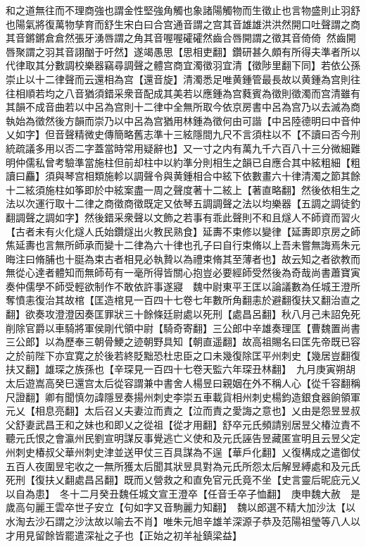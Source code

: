 和之道無往而不理商強也謂金性堅強角觸也象諸陽觸物而生徵止也言物盛則止羽舒也陽氣將復萬物孳育而舒生宋白曰合宫通音謂之宫其音雄雄洪洪然開口吐聲謂之商其音鏘鏘倉倉然張牙湧唇謂之角其音喔喔礭礭然齒合唇開謂之徵其音倚倚然齒開唇聚謂之羽其音詡酗于吁然】遂竭愚思【思相吏翻】鑽研甚久頗有所得夫準者所以代律取其分數調校樂器竊尋調聲之體宫商宜濁徵羽宜清【徵陟里翻下同】若依公孫崇止以十二律聲而云還相為宫【還音旋】清濁悉足唯黄鍾管最長故以黄鍾為宫則往往相順若均之八音猶須錯采衆音配成其美若以應鍾為宫蕤賓為徵則徵濁而宫清雖有其韻不成音曲若以中呂為宫則十二律中全無所取今依京房書中呂為宫乃以去滅為商執始為徵然後方韻而崇乃以中呂為宫猶用林鍾為徵何由可諧【中呂陸德明曰中音仲乂如字】但音聲精微史傳簡略舊志準十三絃隱間九尺不言須柱以不【不讀曰否今刑統疏議多用以否二字蓋當時常用疑辭也】又一寸之内有萬九千六百八十三分微細難明仲儒私曾考驗準當施柱但前却柱中以約準分則相生之韻已自應合其中絃粗細【粗讀曰麤】須與琴宫相類施軫以調聲令與黄鍾相合中絃下依數畫六十律清濁之節其餘十二絃須施柱如筝即於中絃案盡一周之聲度著十二絃上【著直略翻】然後依相生之法以次運行取十二律之商徵商徵既定又依琴五調調聲之法以均樂器【五調之調徒釣翻調聲之調如字】然後錯采衆聲以文飾之若事有乖此聲則不和且燧人不師資而習火【古者未有火化燧人氏始鑽燧出火教民熟食】延夀不束修以變律【延夀即京房之師焦延夀也言無所師承而變十二律為六十律也孔子曰自行束脩以上吾未嘗無誨焉朱元晦注曰脩脯也十脡為束古者相見必執贄以為禮束脩其至薄者也】故云知之者欲教而無從心達者體知而無師苟有一毫所得皆關心抱豈必要經師受然後為奇哉尚書蕭寶寅奏仲儒學不師受輕欲制作不敢依許事遂寢　魏中尉東平王匡以論議數為任城王澄所奪憤恚復治其故棺【匡造棺見一百四十七卷七年數所角翻恚於避翻復扶又翻治直之翻】欲奏攻澄澄因奏匡罪狀三十餘條廷尉處以死刑【處昌呂翻】秋八月己未詔免死削除官爵以車騎將軍侯剛代領中尉【騎奇寄翻】三公郎中辛雄奏理匡【曹魏置尚書三公郎】以為歷奉三朝骨鯁之迹朝野具知【朝直遥翻】故高祖賜名曰匡先帝既已容之於前陛下亦宜寛之於後若終貶黜恐杜忠臣之口未幾復除匡平州刺史【幾居豈翻復扶又翻】雄琛之族孫也【辛琛見一百四十七卷天監六年琛丑林翻】　九月庚寅朔胡太后遊嵩高癸巳還宫太后從容謂兼中書舍人楊昱曰親姻在外不稱人心【從千容翻稱尺證翻】卿有聞慎勿諱隱昱奏揚州刺史李崇五車載貨相州刺史楊鈞造銀食器餉領軍元乂【相息亮翻】太后召乂夫妻泣而責之【泣而責之愛誨之意也】乂由是怨昱昱叔父舒妻武昌王和之妹也和即乂之從祖【從才用翻】舒卒元氏頻請别居昱父椿泣責不聽元氏恨之會瀛州民劉宣明謀反事覺逃亡义使和及元氏誣告昱藏匿宣明且云昱父定州刺史椿叔父華州刺史津並送甲仗三百具謀為不逞【華戶化翻】乂復構成之遣御仗五百人夜圍昱宅收之一無所獲太后聞其狀昱具對為元氏所怨太后解昱縛處和及元氏死刑【復扶乂翻處昌呂翻】既而乂營救之和直免官元氏竟不坐【史言靈后昵庇元乂以自為患】　冬十二月癸丑魏任城文宣王澄卒【任音壬卒子恤翻】　庚申魏大赦　是歲高句麗王雲卒世子安立【句如字又音駒麗力知翻】　魏以郎選不精大加沙汰【以水淘去沙石謂之沙汰故以喻去不肖】唯朱元旭辛雄羊深源子恭及范陽祖瑩等八人以才用見留餘皆罷遣深祉之子也【正始之初羊祉鎮梁益】

